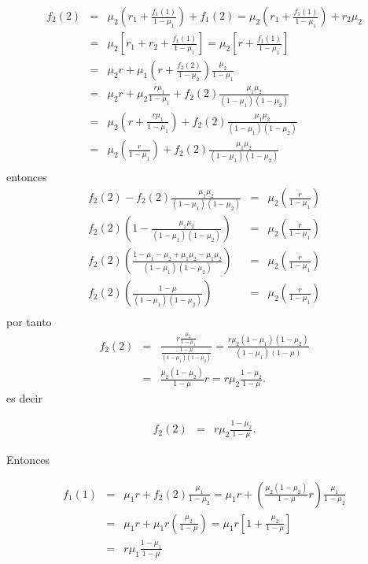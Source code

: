 \begin{eqnarray*}
f_{2}\left(2\right)&=&\mu_{2}\left(r_{1}+\frac{f_{1}\left(1\right)}{1-\mu_{1}}\right)+f_{1}\left(2\right)=\mu_{2}\left(r_{1}+\frac{f_{1}\left(1\right)}{1-\mu_{1}}\right)+r_{2}\mu_{2}\\
&=&\mu_{2}\left[r_{1}+r_{2}+\frac{f_{1}\left(1\right)}{1-\mu_{1}}\right]=\mu_{2}\left[r+\frac{f_{1}\left(1\right)}{1-\mu_{1}}\right]\\
&=&\mu_{2}r+\mu_{1}\left(r+\frac{f_{2}\left(2\right)}{1-\mu_{2}}\right)\frac{\mu_{2}}{1-\mu_{1}}\\
&=&\mu_{2}r+\mu_{2}\frac{r\mu_{1}}{1-\mu_{1}}+f_{2}\left(2\right)\frac{\mu_{1}\mu_{2}}{\left(1-\mu_{1}\right)\left(1-\mu_{2}\right)}\\
&=&\mu_{2}\left(r+\frac{r\mu_{1}}{1-\mu_{1}}\right)+f_{2}\left(2\right)\frac{\mu_{1}\mu_{2}}{\left(1-\mu_{1}\right)\left(1-\mu_{2}\right)}\\
&=&\mu_{2}\left(\frac{r}{1-\mu_{1}}\right)+f_{2}\left(2\right)\frac{\mu_{1}\mu_{2}}{\left(1-\mu_{1}\right)\left(1-\mu_{2}\right)}\\
\end{eqnarray*}
entonces
\begin{eqnarray*}
f_{2}\left(2\right)-f_{2}\left(2\right)\frac{\mu_{1}\mu_{2}}{\left(1-\mu_{1}\right)\left(1-\mu_{2}\right)}&=&\mu_{2}\left(\frac{r}{1-\mu_{1}}\right)\\
f_{2}\left(2\right)\left(1-\frac{\mu_{1}\mu_{2}}{\left(1-\mu_{1}\right)\left(1-\mu_{2}\right)}\right)&=&\mu_{2}\left(\frac{r}{1-\mu_{1}}\right)\\
f_{2}\left(2\right)\left(\frac{1-\mu_{1}-\mu_{2}+\mu_{1}\mu_{2}-\mu_{1}\mu_{2}}{\left(1-\mu_{1}\right)\left(1-\mu_{2}\right)}\right)&=&\mu_{2}\left(\frac{r}{1-\mu_{1}}\right)\\
f_{2}\left(2\right)\left(\frac{1-\mu}{\left(1-\mu_{1}\right)\left(1-\mu_{2}\right)}\right)&=&\mu_{2}\left(\frac{r}{1-\mu_{1}}\right)\\
\end{eqnarray*}
por tanto
\begin{eqnarray*}
f_{2}\left(2\right)&=&\frac{r\frac{\mu_{2}}{1-\mu_{1}}}{\frac{1-\mu}{\left(1-\mu_{1}\right)\left(1-\mu_{2}\right)}}=\frac{r\mu_{2}\left(1-\mu_{1}\right)\left(1-\mu_{2}\right)}{\left(1-\mu_{1}\right)\left(1-\mu\right)}\\
&=&\frac{\mu_{2}\left(1-\mu_{2}\right)}{1-\mu}r=r\mu_{2}\frac{1-\mu_{2}}{1-\mu}.
\end{eqnarray*}
es decir

\begin{eqnarray}
f_{2}\left(2\right)&=&r\mu_{2}\frac{1-\mu_{2}}{1-\mu}.
\end{eqnarray}

Entonces

\begin{eqnarray*}
f_{1}\left(1\right)&=&\mu_{1}r+f_{2}\left(2\right)\frac{\mu_{1}}{1-\mu_{2}}=\mu_{1}r+\left(\frac{\mu_{2}\left(1-\mu_{2}\right)}{1-\mu}r\right)\frac{\mu_{1}}{1-\mu_{2}}\\
&=&\mu_{1}r+\mu_{1}r\left(\frac{\mu_{2}}{1-\mu}\right)=\mu_{1}r\left[1+\frac{\mu_{2}}{1-\mu}\right]\\
&=&r\mu_{1}\frac{1-\mu_{1}}{1-\mu}\\
\end{eqnarray*}
